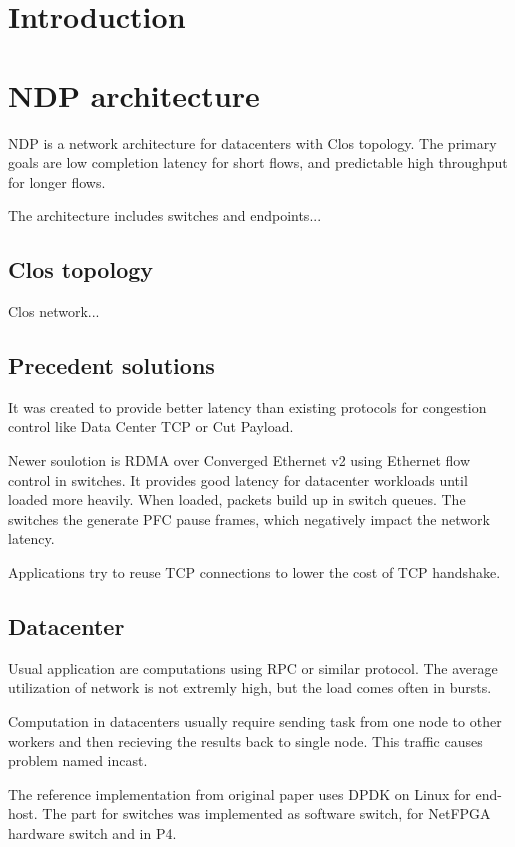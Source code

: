 \chapter{Introduction}


\chapter{NDP architecture}
NDP is a network architecture for datacenters with Clos topology. 
The primary goals are low completion latency for short flows, and predictable high throughput for longer flows.

The architecture includes switches and endpoints...


\section{Clos topology}
Clos network...


\section{Precedent solutions}
It was created to provide better latency than existing protocols for congestion control like Data Center TCP or Cut Payload.

Newer soulotion is RDMA over Converged Ethernet v2 using Ethernet flow control in switches. It provides good latency for datacenter workloads until loaded more heavily.
When loaded, packets build up in switch queues. The switches the generate PFC pause frames, which negatively impact the network latency.

Applications try to reuse TCP connections to lower the cost of TCP handshake.


\section{Datacenter}
Usual application are computations using RPC or similar protocol. The average utilization of network is not extremly high, but the load comes often in bursts.

Computation in datacenters usually require sending task from one node to other workers and then recieving the results back to single node. This traffic causes problem named incast.


The reference implementation from original paper uses DPDK on Linux for end-host.
The part for switches was implemented as software switch, for NetFPGA hardware switch and in P4.

